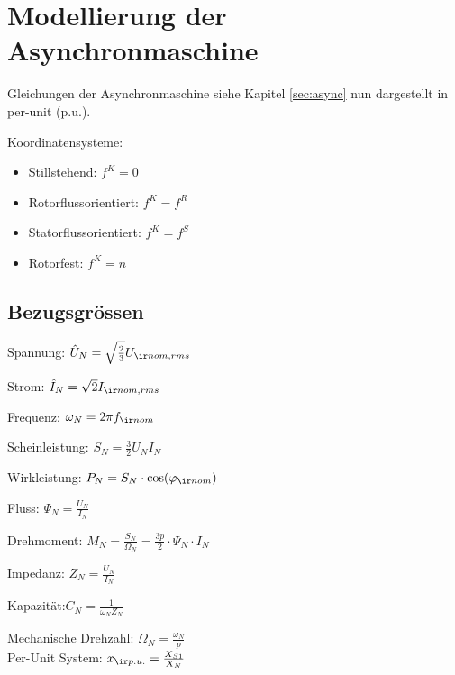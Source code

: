 \documentclass[german]{latex4ei_fs}
\begin{document}
\section{Modellierung der Asynchronmaschine}

\begin{sectionbox}
Gleichungen der Asynchronmaschine siehe Kapitel \ref{sec:async} nun dargestellt in per-unit (p.u.).

Koordinatensysteme:

\begin{itemize}
	\item Stillstehend: $f^K = 0$
	\item Rotorflussorientiert: $f^K = f^R$
	\item Statorflussorientiert: $f^K = f^S$
	\item Rotorfest: $f^K = n$
\end{itemize}
\end{sectionbox}
\begin{sectionbox}
\subsection{Bezugsgrössen}

Spannung: $\hat U_N = \sqrt{\frac{2}{3}} U_{\ir nom, rms} $


Strom: $\hat I_N = \sqrt 2 I_{\ir nom, rms}$

Frequenz: $\omega_N = 2\pi f_{\ir nom}$

Scheinleistung: $S_N = \frac{3}{2} U_N I_N$

Wirkleistung: $P_N = S_N \cdot \cos(\varphi_{\ir nom})$

Fluss: $\Psi_N = \frac{U_N}{I_N}$

Drehmoment: $M_N = \frac{S_N}{\Omega_N} = \frac{3 p }{2} \cdot \Psi_N \cdot I_N$

Impedanz: $Z_N = \frac{U_N}{I_N}$

Kapazität:$ C_N = \frac{1}{\omega_N Z_N}$

Mechanische Drehzahl: $\Omega_N = \frac{\omega_N}{p}$ \\

Per-Unit System:
$x_{\ir p.u.} = \frac{X_{S1}}{X_N}$
\end{sectionbox}
\end{document}
